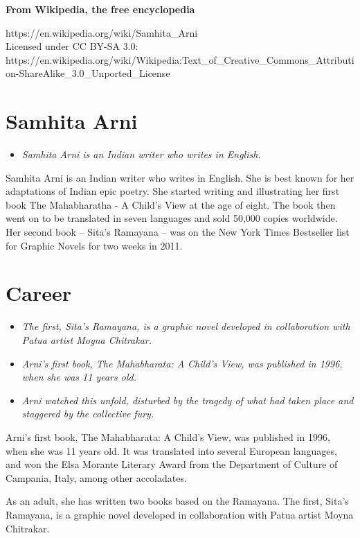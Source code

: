 \textbf{From Wikipedia, the free encyclopedia}

https://en.wikipedia.org/wiki/Samhita\_Arni\\
Licensed under CC BY-SA 3.0:\\
https://en.wikipedia.org/wiki/Wikipedia:Text\_of\_Creative\_Commons\_Attribution-ShareAlike\_3.0\_Unported\_License

\section{Samhita Arni}\label{samhita-arni}

\begin{itemize}
\item
  \emph{Samhita Arni is an Indian writer who writes in English.}
\end{itemize}

Samhita Arni is an Indian writer who writes in English. She is best
known for her adaptations of Indian epic poetry. She started writing and
illustrating her first book The Mahabharatha - A Child's View at the age
of eight. The book then went on to be translated in seven languages and
sold 50,000 copies worldwide. Her second book -- Sita's Ramayana -- was
on the New York Times Bestseller list for Graphic Novels for two weeks
in 2011.

\section{Career}\label{career}

\begin{itemize}
\item
  \emph{The first, Sita's Ramayana, is a graphic novel developed in
  collaboration with Patua artist Moyna Chitrakar.}
\item
  \emph{Arni's first book, The Mahabharata: A Child's View, was
  published in 1996, when she was 11 years old.}
\item
  \emph{Arni watched this unfold, disturbed by the tragedy of what had
  taken place and staggered by the collective fury.}
\end{itemize}

Arni's first book, The Mahabharata: A Child's View, was published in
1996, when she was 11 years old. It was translated into several European
languages, and won the Elsa Morante Literary Award from the Department
of Culture of Campania, Italy, among other accoladates.

As an adult, she has written two books based on the Ramayana. The first,
Sita's Ramayana, is a graphic novel developed in collaboration with
Patua artist Moyna Chitrakar.

